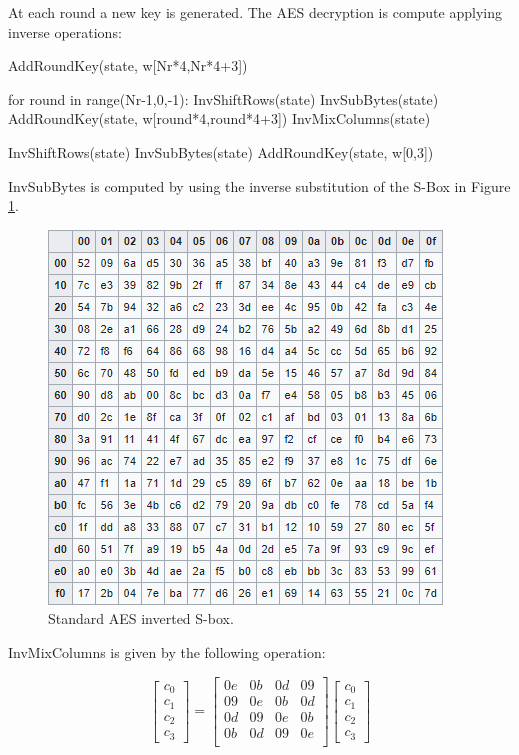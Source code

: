 \documentclass[a4paper, 12pt]{report}
\begin{document}
At each round a new key is generated.
\newpage
The AES decryption is compute applying inverse operations:
\begin{python}
	AddRoundKey(state, w[Nr*4,Nr*4+3])
	
	for round in range(Nr-1,0,-1):
		InvShiftRows(state)
		InvSubBytes(state)
		AddRoundKey(state, w[round*4,round*4+3])
		InvMixColumns(state)
		
	InvShiftRows(state)
	InvSubBytes(state)
	AddRoundKey(state, w[0,3])
\end{python}

InvSubBytes is computed by using the inverse substitution of the S-Box in Figure \ref{fig:inversesbox}.

\begin{figure}[H]
	\centering
	\includegraphics[scale=0.7]{images/Lec8/inversesbox.png}
	\caption{Standard AES inverted S-box.}
	\label{fig:inversesbox}
\end{figure}

InvMixColumns is given by the following operation:

\begin{center}	
	\[ \left[ \begin{array}{c}
	c_0 \\
	c_1 \\
	c_2 \\
	c_3
	\end{array} \right]
	=
	\left[ \begin{array}{cccc}
	0e & 0b & 0d & 09 \\
	09 & 0e & 0b & 0d \\
	0d & 09 & 0e & 0b \\
	0b & 0d & 09 & 0e \\
	\end{array} \right]
	\left[ \begin{array}{c}
	c_0 \\
	c_1 \\
	c_2 \\
	c_3
	\end{array} \right]
	\]
\end{center}
\end{document}
